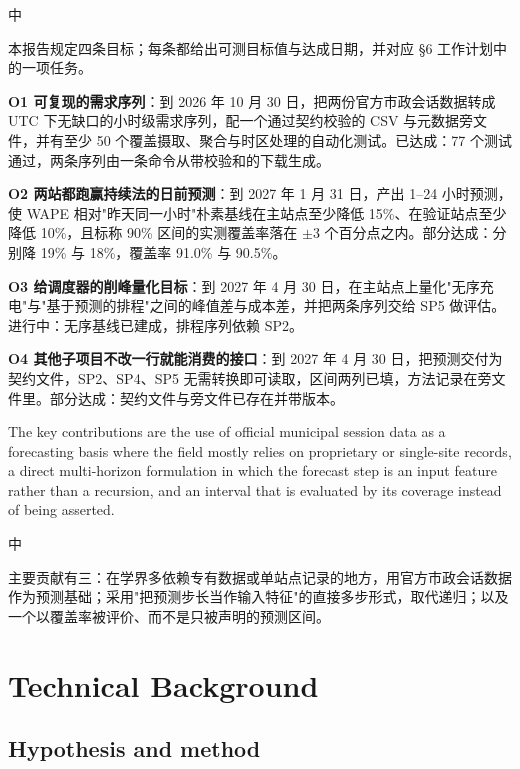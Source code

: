 \documentclass[10pt,a4paper]{article}
\newenvironment{zh}{%
  \par\vspace{1pt}%
  \begingroup
  \color{black!72}\small
  \setlength{\parskip}{0pt}%
  \noindent\textsf{\footnotesize 中}\hspace{3pt}\ignorespaces
}{%
  \par\endgroup\vspace{4pt}%
}
\begin{document}
\begin{zh}
本报告规定四条目标；每条都给出可测目标值与达成日期，并对应 §6 工作计划中的一项任务。

\textbf{O1 可复现的需求序列}：到 2026 年 10 月 30 日，把两份官方市政会话数据转成 UTC 下无缺口的小时级需求序列，配一个通过契约校验的 CSV 与元数据旁文件，并有至少 50 个覆盖摄取、聚合与时区处理的自动化测试。已达成：77 个测试通过，两条序列由一条命令从带校验和的下载生成。

\textbf{O2 两站都跑赢持续法的日前预测}：到 2027 年 1 月 31 日，产出 1--24 小时预测，使 WAPE 相对"昨天同一小时"朴素基线在主站点至少降低 15\%、在验证站点至少降低 10\%，且标称 90\% 区间的实测覆盖率落在 $\pm$3 个百分点之内。部分达成：分别降 19\% 与 18\%，覆盖率 91.0\% 与 90.5\%。

\textbf{O3 给调度器的削峰量化目标}：到 2027 年 4 月 30 日，在主站点上量化"无序充电"与"基于预测的排程"之间的峰值差与成本差，并把两条序列交给 SP5 做评估。进行中：无序基线已建成，排程序列依赖 SP2。

\textbf{O4 其他子项目不改一行就能消费的接口}：到 2027 年 4 月 30 日，把预测交付为契约文件，SP2、SP4、SP5 无需转换即可读取，区间两列已填，方法记录在旁文件里。部分达成：契约文件与旁文件已存在并带版本。
\end{zh}

The key contributions are the use of official municipal session data as a forecasting basis where
the field mostly relies on proprietary or single-site records, a direct multi-horizon formulation in
which the forecast step is an input feature rather than a recursion, and an interval that is
evaluated by its coverage instead of being asserted.

\begin{zh}
主要贡献有三：在学界多依赖专有数据或单站点记录的地方，用官方市政会话数据作为预测基础；采用"把预测步长当作输入特征"的直接多步形式，取代递归；以及一个以覆盖率被评价、而不是只被声明的预测区间。
\end{zh}

\section{Technical Background}

\subsection{Hypothesis and method}
\end{document}
